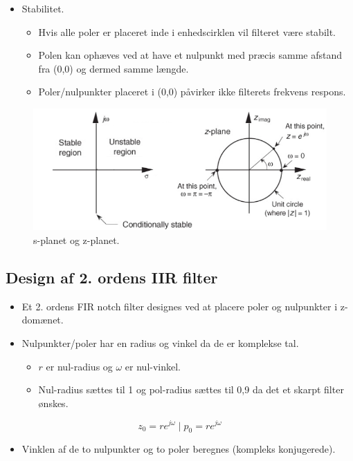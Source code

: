 \documentclass[danish]{article}
\begin{document}
\begin{itemize}
	\item Stabilitet.
	\begin{itemize}
		\item Hvis alle poler er placeret inde i enhedscirklen vil filteret være stabilt.
		\item Polen kan ophæves ved at have et nulpunkt med præcis samme afstand fra (0,0) og dermed samme længde.
		\item Poler/nulpunkter placeret i (0,0) påvirker ikke filterets frekvens respons. 
	\end{itemize}
\end{itemize}

\begin{figure}[H]
	\centering
	\includegraphics[width=0.8\linewidth]{graphics/unitycircle}
	\caption{s-planet og z-planet.}
	\label{fig:unitycircle}
\end{figure}

\subsection{Design af 2. ordens IIR filter}
\begin{itemize}
	\item Et 2. ordens FIR notch filter designes ved at placere poler og nulpunkter i z-domænet.
	\item Nulpunkter/poler har en radius og vinkel da de er komplekse tal.
	\begin{itemize}
		\item $r$ er nul-radius og $\omega$ er nul-vinkel.
		\item Nul-radius sættes til 1 og pol-radius sættes til 0,9 da det et skarpt filter ønskes.
	\end{itemize}
\end{itemize}

\begin{equation}
z_0 = r e^{j\omega} \mid p_0 = r e^{j\omega}
\end{equation}

\begin{itemize}
	\item Vinklen af de to nulpunkter og to poler beregnes (kompleks konjugerede).
\end{itemize}
\end{document}
